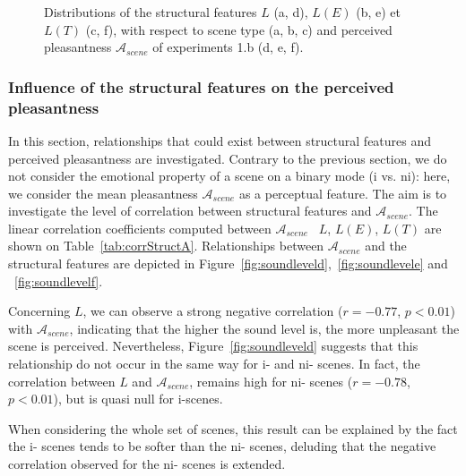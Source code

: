 \documentclass[twoside,twocolumn]{article}
\begin{document}
\begin{figure}[t]
       \caption{Distributions of the structural features $L$ (a, d), $L(E)$ (b, e) et $L(T)$ (c, f), with respect to scene type (a, b, c) and perceived pleasantness $\mathcal{A}_{scene}$ of experiments 1.b (d, e, f).}
\end{figure}

\subsubsection*{Influence of the structural features on the perceived pleasantness}

In this section, relationships that could exist between structural features and perceived pleasantness are investigated. Contrary to the previous section, we do not consider the emotional property of a scene on a binary mode (i vs. ni): here, we consider the mean pleasantness $\mathcal{A}_{scene}$ as a perceptual feature. The aim is to investigate the level of correlation between structural features and $\mathcal{A}_{scene}$. The linear correlation coefficients computed between $\mathcal{A}_{scene}$ \vs~$L$, $L(E)$, $L(T)$ are shown on Table~\ref{tab:corrStructA}. Relationships between $\mathcal{A}_{scene}$ and the structural features are depicted in Figure~\ref{fig:soundleveld},~\ref{fig:soundlevele} and ~\ref{fig:soundlevelf}.

Concerning $L$, we can observe a strong negative correlation ($r=-0.77$, $p<0.01$) with $\mathcal{A}_{scene}$, indicating that the higher the sound level is, the more unpleasant the scene is perceived. Nevertheless, Figure~\ref{fig:soundleveld} suggests that this relationship do not occur in the same way for i- and ni- scenes. In fact, the correlation between $L$ and $\mathcal{A}_{scene}$, remains high for ni- scenes ($r=-0.78$, $p<0.01$), but is quasi null for i-scenes.

When considering the whole set of scenes, this result can be explained by the fact the i- scenes tends to be softer than the ni- scenes, deluding that the negative correlation observed for the ni- scenes is extended.
\end{document}
